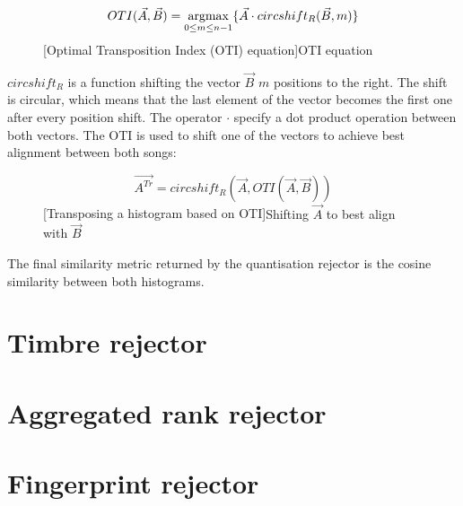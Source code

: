 \begin{figure}[H]
   \begin{equation}
       OTI(\vec{A}, \vec{B}) = \operatorname*{argmax}_{0 \leq m \leq {n-1}}\{\vec{A} \cdot circshift_{R}(\vec{B}, m)\}
   \end{equation}
   [Optimal Transposition Index (OTI) equation]{OTI equation}
\end{figure}

$circshift_R$ is a function shifting the vector $\vec{B}$ $m$ positions to the
right. The shift is circular, which means that the last element of the vector
becomes the first one after every position shift. The operator $\cdot$ specify a
dot product operation between both vectors. The OTI is used to shift one of the
vectors to achieve best alignment between both songs:
\begin{figure}[H]
\begin{equation}
    \vec{A^{Tr}} = circshift_R(\vec{A}, OTI(\vec{A}, \vec{B})) 
\end{equation}
[Transposing a histogram based on OTI]{Shifting $\vec{A}$ to best align with $\vec{B}$}
\end{figure}

The final similarity metric returned
by the quantisation rejector is the cosine similarity between both histograms.
\section{Timbre rejector} 
\label{sec:quantisation}
\section{Aggregated rank rejector} 
\label{sec:timbre}
\section{Fingerprint rejector} 
\label{sec:rankaggregation}

